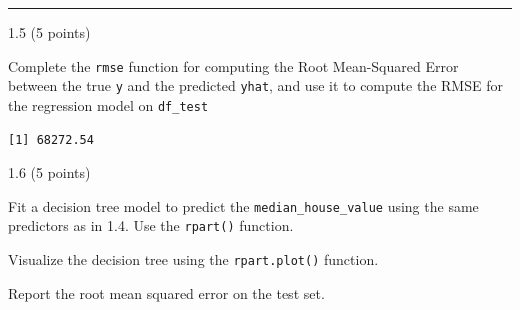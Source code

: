 \documentclass[
  letterpaper,
  DIV=11,
  numbers=noendperiod]{scrartcl}
\newenvironment{Shaded}{\begin{snugshade}}{\end{snugshade}}
\newcommand{\AttributeTok}[1]{\textcolor[rgb]{0.40,0.45,0.13}{#1}}
\newcommand{\CommentTok}[1]{\textcolor[rgb]{0.37,0.37,0.37}{#1}}
\newcommand{\ControlFlowTok}[1]{\textcolor[rgb]{0.00,0.23,0.31}{#1}}
\newcommand{\DecValTok}[1]{\textcolor[rgb]{0.68,0.00,0.00}{#1}}
\newcommand{\FunctionTok}[1]{\textcolor[rgb]{0.28,0.35,0.67}{#1}}
\newcommand{\NormalTok}[1]{\textcolor[rgb]{0.00,0.23,0.31}{#1}}
\newcommand{\OtherTok}[1]{\textcolor[rgb]{0.00,0.23,0.31}{#1}}
\newcommand{\SpecialCharTok}[1]{\textcolor[rgb]{0.37,0.37,0.37}{#1}}
\begin{document}
\begin{center}\rule{0.5\linewidth}{0.5pt}\end{center}

1.5 (5 points)

Complete the \texttt{rmse} function for computing the Root Mean-Squared
Error between the true \texttt{y} and the predicted \texttt{yhat}, and
use it to compute the RMSE for the regression model on \texttt{df\_test}

\begin{Shaded}
\end{Shaded}

\begin{verbatim}
[1] 68272.54
\end{verbatim}

1.6 (5 points)

Fit a decision tree model to predict the \texttt{median\_house\_value}
using the same predictors as in 1.4. Use the \texttt{rpart()} function.

Visualize the decision tree using the \texttt{rpart.plot()} function.

Report the root mean squared error on the test set.
\end{document}
